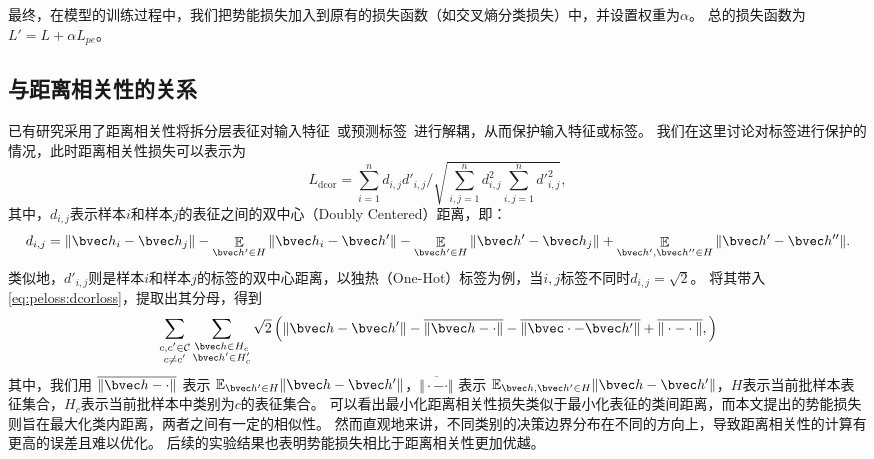 最终，在模型的训练过程中，我们把势能损失加入到原有的损失函数（如交叉熵分类损失）中，并设置权重为$\alpha$。
总的损失函数为$L' = L + \alpha L_{pe}$。

\subsection{与距离相关性的关系}
已有研究采用了距离相关性将拆分层表征对输入特征~\cite{vepakomma2020nopeek}或预测标签~\cite{sunjiankai2022forward_embedding_protect}进行解耦，从而保护输入特征或标签。
%
我们在这里讨论对标签进行保护的情况，此时距离相关性损失可以表示为
\begin{equation}
\label{eq:peloss:dcorloss}
    L_\text{dcor} = \sum_{i=1}^n d_{i,j} d'_{i, j} \Big/ \sqrt{\sum_{i,j=1}^n d_{i, j}^2 \sum_{i,j=1}^n {d'}_{i, j}^2},
\end{equation}
%
其中，$d_{i,j}$表示样本$i$和样本$j$的表征之间的双中心（Doubly Centered）距离，即：
\begin{equation}
    d_{i, j} = \Vert \bvec h_i - \bvec h_j \Vert - \mathop{\mathbb E}_{\bvec h'\in H}\Vert \bvec h_i - \bvec h' \Vert - \mathop{\mathbb E}_{\bvec h'\in H}\Vert \bvec h' - \bvec h_j \Vert + \mathop{\mathbb E}_{\bvec h', \bvec h'' \in H}\Vert \bvec h' - \bvec h'' \Vert.
\end{equation}
%
类似地，$d'_{i,j}$则是样本$i$和样本$j$的标签的双中心距离，以独热（One-Hot）标签为例，当$i,j$标签不同时$d_{i,j} = \sqrt 2$。
将其带入\autoref{eq:peloss:dcorloss}，提取出其分母，得到
\begin{equation}
    \sum_{\substack{c,c'\in \mathcal C \\ c\ne c'}} \sum_{\substack{\bvec h\in H_c \\ \bvec h' \in H_c'}} \sqrt2 
    \left( 
        \Vert \bvec h - \bvec h'\Vert - \overline{\Vert \bvec h - \cdot \Vert} - \overline{\Vert \bvec \cdot - \bvec h' \Vert} + \overline{\Vert \cdot - \cdot\Vert}, 
    \right)
\end{equation}
其中，我们用 $\overline{\Vert \bvec h - \cdot \Vert}$ 表示 $\mathbb E_{\bvec h'\in H} \Vert \bvec h - \bvec h'\Vert$，$\overline{\Vert \cdot - \cdot \Vert}$ 表示 $\mathbb E_{\bvec h, \bvec h'\in H} \Vert \bvec h - \bvec h'\Vert$，$H$表示当前批样本表征集合，$H_c$表示当前批样本中类别为$c$的表征集合。
%
可以看出最小化距离相关性损失类似于最小化表征的类间距离，而本文提出的势能损失则旨在最大化类内距离，两者之间有一定的相似性。
%
然而直观地来讲，不同类别的决策边界分布在不同的方向上，导致距离相关性的计算有更高的误差且难以优化。
%
后续的实验结果也表明势能损失相比于距离相关性更加优越。


